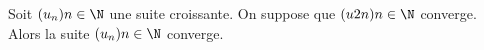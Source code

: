 Soit $(u_n){n\in\N}$ une suite croissante. On suppose que $(u{2n}){n\in\N}$ converge. Alors la suite $(u_n){n\in\N}$ converge.

\begin{reponses}
\end{reponses}

